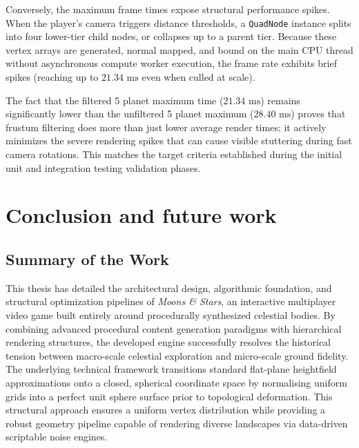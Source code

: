\documentclass[12pt]{report}
\begin{document}
Conversely, the maximum frame times expose structural performance spikes. When the player's camera triggers distance thresholds, a \texttt{QuadNode} instance splits into four lower-tier child nodes, or collapses up to a parent tier. Because these vertex arrays are generated, normal mapped, and bound on the main CPU thread without asynchronous compute worker execution, the frame rate exhibits brief spikes (reaching up to $21.34\text{ ms}$ even when culled at scale). 

The fact that the filtered 5 planet maximum time ($21.34\text{ ms}$) remains significantly lower than the unfiltered 5 planet maximum ($28.40\text{ ms}$) proves that frustum filtering does more than just lower average render times; it actively minimizes the severe rendering spikes that can cause visible stuttering during fast camera rotations. This matches the target criteria established during the initial unit and integration testing validation phases.

\chapter{Conclusion and future work}
\label{ch:conclusion_future_work}

\section{Summary of the Work}

This thesis has detailed the architectural design, algorithmic foundation, and structural optimization pipelines of \textit{Moons \& Stars}, an interactive multiplayer video game built entirely around procedurally synthesized celestial bodies. By combining advanced procedural content generation paradigms with hierarchical rendering structures, the developed engine successfully resolves the historical tension between macro-scale celestial exploration and micro-scale ground fidelity. The underlying technical framework transitions standard flat-plane heightfield approximations onto a closed, spherical coordinate space by normalising uniform grids into a perfect unit sphere surface prior to topological deformation. This structural approach ensures a uniform vertex distribution while providing a robust geometry pipeline capable of rendering diverse landscapes via data-driven scriptable noise engines.
\end{document}
